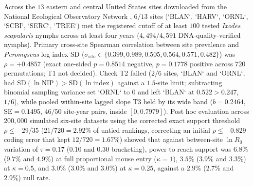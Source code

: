 Across the $13$ eastern and central United States sites downloaded from the National Ecological Observatory Network \citep[RELEASE-2026 plus provisional 2020--2021 and 2025--2026 site-months, accessed 14 November 2026, $2{,}393$ site-months and $4{,}049$ files;][]{neon2026a,neon2026b,neon2026c}, $6/13$ sites (`BLAN`, `HARV`, `ORNL`, `SCBI`, `SERC`, `TREE`) met the registered cutoff of at least $100$ tested \textit{Ixodes scapularis} nymphs across at least four years ($4{,}494/4{,}591$ DNA-quality-verified nymphs). Primary cross-site Spearman correlation between site prevalence and \textit{Peromyscus} log-index SD ($\sigma_{\mathrm{site}} \in \{0.399, 0.989, 0.505, 0.564, 0.571, 0.482\}$) was $\rho = +0.4857$ (exact one-sided $p = 0.8514$ negative, $p = 0.1778$ positive across $720$ permutations; T1 not decided). Check T2 failed ($2/6$ sites, `BLAN` and `ORNL`, had $\mathrm{SD}(\ln\mathrm{NIP}) > \mathrm{SD}(\ln\text{index})$ against a $1.5$-site limit; subtracting binomial sampling variance set `ORNL` to $0$ and left `BLAN` at $0.522 > 0.247$, $1/6$), while pooled within-site lagged slope T3 held by its wide band ($b = 0.2464$, $\mathrm{SE} = 0.1495$, $46/50$ site-year pairs, inside $[0, 0.7979]$). Post hoc evaluation across $200{,}000$ simulated six-site datasets using the corrected exact support threshold $\rho \le -29/35$ ($21/720 = 2.92\%$ of untied rankings, correcting an initial $\rho \le -0.829$ coding error that kept $12/720 = 1.67\%$) showed that against between-site $\ln R_0$ variation of $\tau = 0.17$ ($0.10$ and $0.30$ bracketing), power to reach support was $6.8\%$ ($9.7\%$ and $4.9\%$) at full proportional mouse entry ($\kappa = 1$), $3.5\%$ ($3.9\%$ and $3.3\%$) at $\kappa = 0.5$, and $3.0\%$ ($3.0\%$ and $3.0\%$) at $\kappa = 0.25$, against a $2.9\%$ ($2.7\%$ and $2.9\%$) null rate.

